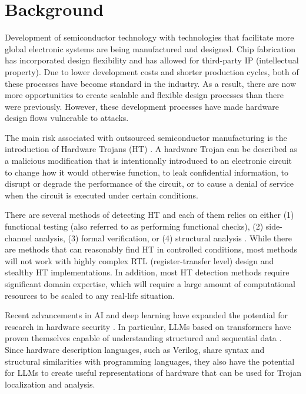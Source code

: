 \documentclass[12pt,a4paper]{report}
\begin{document}
\section{Background}

Development of semiconductor technology with technologies that facilitate more global electronic systems are being manufactured and designed. Chip fabrication has incorporated design flexibility and has allowed for third-party IP (intellectual property). Due to lower development costs and shorter production cycles, both of these processes have become standard in the industry. As a result, there are now more opportunities to create scalable and flexible design processes than there were previously. However, these development processes have made hardware design flows vulnerable to attacks.


The main risk associated with outsourced semiconductor manufacturing is the introduction of Hardware Trojans (HT) \cite{ref6,ref7}. A hardware Trojan can be described as a malicious modification that is intentionally introduced to an electronic circuit to change how it would otherwise function, to leak confidential information, to disrupt or degrade the performance of the circuit, or to cause a denial of service when the circuit is executed under certain conditions.


There are several methods of detecting HT and each of them relies on either (1) functional testing (also referred to as performing functional checks), (2) side-channel analysis, (3) formal verification, or (4) structural analysis \cite{ref6,ref7}. While there are methods that can reasonably find HT in controlled conditions, most methods will not work with highly complex RTL (register-transfer level) design and stealthy HT implementations. In addition, most HT detection methods require significant domain expertise, which will require a large amount of computational resources to be scaled to any real-life situation.

Recent advancements in AI and deep learning have expanded the potential for research in hardware security \cite{ref8,ref10}. In particular, LLMs based on transformers have proven themselves capable of understanding structured and sequential data \cite{ref8,ref10}. Since hardware description languages, such as Verilog, share syntax and structural similarities with programming languages, they also have the potential for LLMs to create useful representations of hardware that can be used for Trojan localization and analysis.
\end{document}
